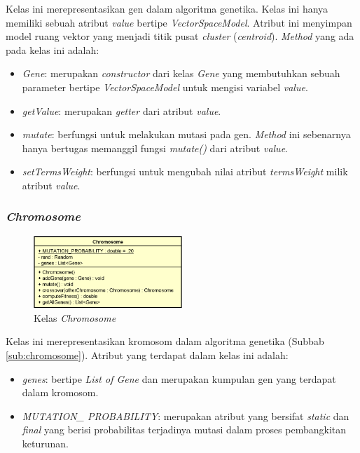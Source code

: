 \documentclass[a4paper,twoside]{article}
\begin{document}
\begin{enumerate}
Kelas ini merepresentasikan gen dalam algoritma genetika. Kelas ini hanya memiliki sebuah atribut \textit{value} bertipe \textit{VectorSpaceModel}. Atribut ini menyimpan model ruang vektor yang menjadi titik pusat \textit{cluster} (\textit{centroid}). \textit{Method} yang ada pada kelas ini adalah:

\begin{itemize}
	\item \textit{Gene}: merupakan \textit{constructor} dari kelas \textit{Gene} yang membutuhkan sebuah parameter bertipe \textit{VectorSpaceModel} untuk mengisi variabel \textit{value}.
	\item \textit{getValue}: merupakan \textit{getter} dari atribut \textit{value}.
	\item \textit{mutate}: berfungsi untuk melakukan mutasi pada gen. \textit{Method} ini sebenarnya hanya bertugas memanggil fungsi \textit{mutate()} dari atribut \textit{value}.
	\item \textit{setTermsWeight}: berfungsi untuk mengubah nilai atribut \textit{termsWeight} milik atribut \textit{value}.
\end{itemize}

\subsubsection*{\textit{Chromosome}}

\begin{figure}[h]
	\begin{center}
		\includegraphics[width=0.5\textwidth]{DiagramKelas/Chromosome}
		\caption{Kelas \textit{Chromosome}}
		\label{fig:kelasChromosome}
	\end{center}
\end{figure}

Kelas ini merepresentasikan kromosom dalam algoritma genetika (Subbab \ref{sub:chromosome}). Atribut yang terdapat dalam kelas ini adalah:

\begin{itemize}
	\item \textit{genes}: bertipe \textit{List of Gene} dan merupakan kumpulan gen yang terdapat dalam kromosom.
	\item \textit{MUTATION\_ PROBABILITY}: merupakan atribut yang bersifat \textit{static} dan \textit{final} yang berisi probabilitas terjadinya mutasi dalam proses pembangkitan keturunan.
\end{itemize}


\end{enumerate}
\end{document}
